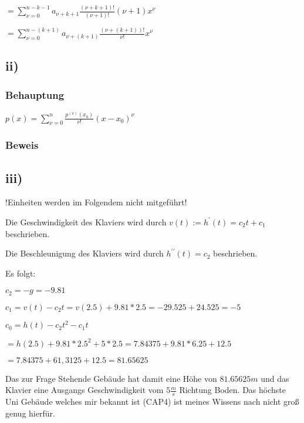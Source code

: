 $ = \sum\limits^{n-k-1}_{\nu=0} a_{\nu+k+1} \frac{(\nu+k+1)!}{(\nu+1)!} (\nu+1)x^{\nu}$

$ = \sum\limits^{n -(k+1)}_{\nu=0} a_{\nu+(k+1)} \frac{(\nu+(k+1))!}{\nu!} x^{\nu}$

\subsection*{ii)}

\subsubsection*{Behauptung}

$p(x) = \sum\limits^{n}_{\nu = 0} \frac{p^{(\nu)}(x_{0})}{\nu!} (x-x_{0})^{\nu}$

\subsubsection*{Beweis}

\subsection*{iii)}

\begin{large}
!Einheiten werden im Folgendem nicht mitgeführt!
\end{large}

Die Geschwindigkeit des Klaviers wird durch $v(t) := h^{\prime}(t) = c_{2}t + c_{1}$ beschrieben.

Die Beschleunigung des Klaviers wird durch $h^{\prime\prime}(t) = c_{2}$ beschrieben.

Es folgt:

$c_{2} = -g = -9.81$

$c_{1} = v(t) - c_{2}t = v(2.5) + 9.81*2.5 = -29.525 + 24.525 = -5$

$c_{0} = h(t) - c_{2}t^{2} - c_{1}t$

$= h(2.5) + 9.81 * 2.5^{2} + 5 * 2.5 = 7.84375 + 9.81 * 6.25 + 12.5$
 
$ = 7.84375 + 61,3125 + 12.5 = 81.65625$

Das zur Frage Stehende Gebäude hat damit eine Höhe von $81.65625m$ und das Klavier eine Ausgangs Geschwindigkeit vom $5\frac{m}{s}$ Richtung Boden.
Das höchste Uni Gebäude welches mir bekannt ist (CAP4) ist meines Wissens nach nicht groß genug hierfür.
       
 